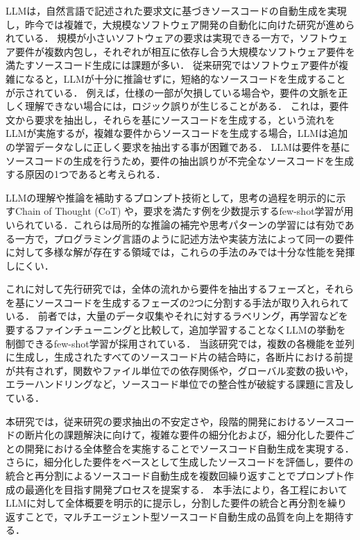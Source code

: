 \documentclass[submit,techrep,noauthor]{ipsj}
\begin{document}
LLMは，自然言語で記述された要求文に基づきソースコードの自動生成を実現し，昨今では複雑で，大規模なソフトウェア開発の自動化に向けた研究が進められている\cite{LLM_CodeGeneration}．
規模が小さいソフトウェアの要求は実現できる一方で，ソフトウェア要件が複数内包し，それぞれが相互に依存し合う大規模なソフトウェア要件を満たすソースコード生成には課題が多い．
従来研究ではソフトウェア要件が複雑になると，LLMが十分に推論せずに，短絡的なソースコードを生成することが示されている\cite{IllusionApple}．
例えば，仕様の一部が欠損している場合や，要件の文脈を正しく理解できない場合には，ロジック誤りが生じることがある．
これは，要件文から要求を抽出し，それらを基にソースコードを生成する，という流れをLLMが実施するが，複雑な要件からソースコードを生成する場合，LLMは追加の学習データなしに正しく要求を抽出する事が困難である．
LLMは要件を基にソースコードの生成を行うため，要件の抽出誤りが不完全なソースコードを生成する原因の1つであると考えられる．

LLMの理解や推論を補助するプロンプト技術として，思考の過程を明示的に示すChain of Thought (CoT) や，要求を満たす例を少数提示するfew-shot学習が用いられている\cite{LLM_fewshot}．これらは局所的な推論の補完や思考パターンの学習には有効である一方で，プログラミング言語のように記述方法や実装方法によって同一の要件に対して多様な解が存在する領域では，これらの手法のみでは十分な性能を発揮しにくい．

これに対して先行研究では，全体の流れから要件を抽出するフェーズと，それらを基にソースコードを生成するフェーズの2つに分割する手法が取り入れられている\cite{tosem}．
前者では，大量のデータ収集やそれに対するラベリング，再学習などを要するファインチューニングと比較して，追加学習することなくLLMの挙動を制御できるfew-shot学習が採用されている．
当該研究では，複数の各機能を並列に生成し，生成されたすべてのソースコード片の結合時に，各断片における前提が共有されず，関数やファイル単位での依存関係や，グローバル変数の扱いや，エラーハンドリングなど，ソースコード単位での整合性が破綻する課題に言及している．


本研究では，従来研究\cite{tosem}の要求抽出の不安定さや，段階的開発におけるソースコードの断片化の課題解決に向けて，複雑な要件の細分化および，細分化した要件ごとの開発における全体整合を実施することでソースコード自動生成を実現する．
さらに，細分化した要件をベースとして生成したソースコードを評価し，要件の統合と再分割によるソースコード自動生成を複数回繰り返すことでプロンプト作成の最適化を目指す開発プロセスを提案する．
本手法により，各工程においてLLMに対して全体概要を明示的に提示し，分割した要件の統合と再分割を繰り返すことで，マルチエージェント型ソースコード自動生成の品質を向上を期待する．
\end{document}
